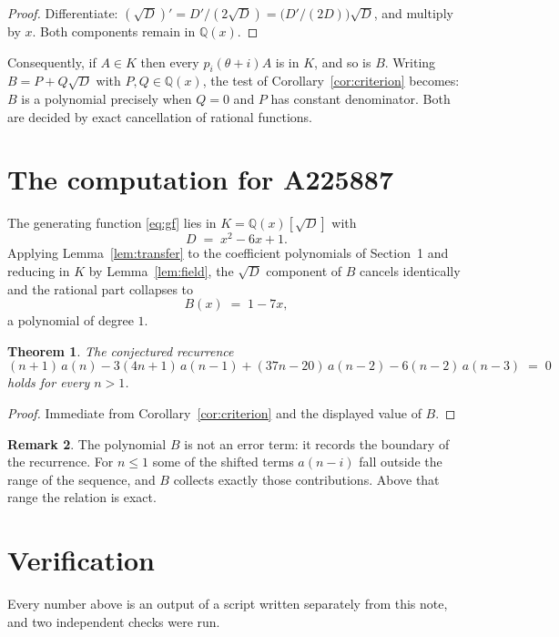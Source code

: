 \documentclass[11pt,a4paper]{article}
\theoremstyle{plain}
\newtheorem{theorem}{Theorem}
\theoremstyle{definition}
\newtheorem{remark}[theorem]{Remark}
\begin{document}
\begin{proof}
Differentiate: $(\sqrt{D})'=D'/(2\sqrt{D})=\bigl(D'/(2D)\bigr)\sqrt{D}$, and multiply by
$x$. Both components remain in $\mathbb{Q}(x)$.
\end{proof}

Consequently, if $A\in K$ then every $p_{i}(\theta+i)A$ is in $K$, and so is $B$. Writing
$B=P+Q\sqrt{D}$ with $P,Q\in\mathbb{Q}(x)$, the test of Corollary~\ref{cor:criterion}
becomes: $B$ is a polynomial precisely when $Q=0$ and $P$ has constant denominator. Both
are decided by exact cancellation of rational functions.

\section{The computation for A225887}

The generating function \eqref{eq:gf} lies in $K=\mathbb{Q}(x)[\sqrt{D}]$ with
\[
D \;=\; x^{2} - 6 x + 1 .
\]
Applying Lemma~\ref{lem:transfer} to the coefficient polynomials of Section~1 and reducing
in $K$ by Lemma~\ref{lem:field}, the $\sqrt{D}$ component of $B$ cancels identically and
the rational part collapses to
\[
B(x)\;=\;1 - 7 x ,
\]
a polynomial of degree $1$.

\begin{theorem}
The conjectured recurrence
\[
(n + 1)\,a(n) -  3 \left(4 n + 1\right)\,a(n-1) + (37 n - 20)\,a(n-2) -  6 \left(n - 2\right)\,a(n-3) \;=\;0
\]
holds for every $n>1$.
\end{theorem}

\begin{proof}
Immediate from Corollary~\ref{cor:criterion} and the displayed value of $B$.
\end{proof}

\begin{remark}
The polynomial $B$ is not an error term: it records the boundary of the recurrence. For
$n\le1$ some of the shifted terms $a(n-i)$ fall outside the range of the sequence,
and $B$ collects exactly those contributions. Above that range the relation is exact.
\end{remark}

\section{Verification}

Every number above is an output of a script written separately from this note, and two
independent checks were run.
\end{document}
